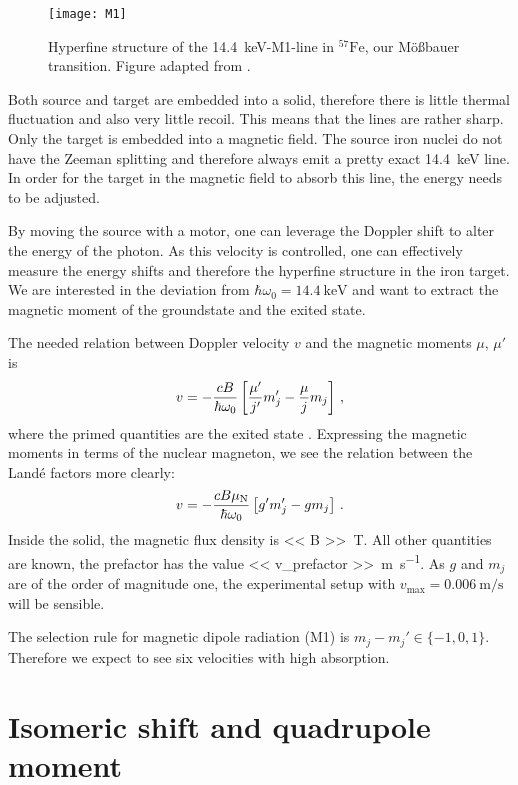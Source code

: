 \documentclass[11pt, english, fleqn, DIV=15, headinclude, BCOR=2cm]{scrreprt}
\begin{document}
\begin{figure}
    \centering
    \texttt{[image: M1]}
    \caption{%
        Hyperfine structure of the \SI{14.4}{\kilo\electronvolt}-M1-line in
        $^{57}\mathrm{Fe}$, our Mößbauer transition.
        Figure adapted from
        \textcite[Abb.~4.22]{Schatz/Nukleare_Festkoerperphysik}.
    }
    \label{fig:M1}
\end{figure}

Both source and target are embedded into a solid, therefore there is
little thermal fluctuation and also very little recoil. This means that the
lines are rather sharp. Only the target is embedded into a magnetic field. The
source iron nuclei do not have the Zeeman splitting and therefore always emit a
pretty exact \SI{14.4}{\kilo\electronvolt} line. In order for the target in the
magnetic field to absorb this line, the energy needs to be adjusted.

By moving the source with a motor, one can leverage the Doppler shift to alter
the energy of the photon. As this velocity is controlled, one can effectively
measure the energy shifts and therefore the hyperfine structure in the iron
target. We are interested in the deviation from $\hbar \omega_0 =
\SI{14.4}{\kilo\electronvolt}$ and want to extract the magnetic moment of the
groundstate and the exited state.

The needed relation between Doppler velocity $v$ and the magnetic moments
$\mu$, $\mu'$ is
\[
    v = - \frac{c B}{\hbar \omega_0}
    \left[ \frac{\mu'}{j'} m_j' - \frac{\mu}{j} m_j \right]
    \,,
\]
where the primed quantities are the exited state
\parencite[(4.42)]{Schatz/Nukleare_Festkoerperphysik}. Expressing the magnetic
moments in terms of the nuclear magneton, we see the relation between the Landé
factors more clearly:
\begin{equation}
    \label{eq:velocity}
    v = - \frac{c B \mu_\text N}{\hbar \omega_0} \left[ g' m_j' - g m_j \right] \,.
\end{equation}
Inside the solid, the magnetic flux density is \SI{<< B >>}{\tesla}. All other
quantities are known,
the prefactor has the value \SI{<< v_prefactor >>}{\meter\per\second}. As $g$
and $m_j$ are of the order of magnitude one, the experimental setup with
$v_\text{max} = \SI{0.006}{\meter\per\second}$ will be sensible.

The selection rule for magnetic dipole radiation (M1) is $m_j - m_j' \in \{ -1,
0, 1 \}$. Therefore we expect to see six velocities with high absorption.

\section{Isomeric shift and quadrupole moment}
\end{document}
